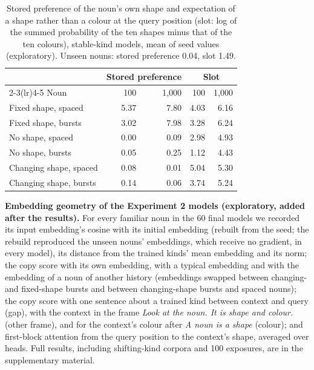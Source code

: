 \begin{table}[!htbp]
\centering\small

\begin{tabular}{@{}lrrrr@{}}
\toprule
 & \multicolumn{2}{c}{Stored preference} & \multicolumn{2}{c}{Slot} \\ \cmidrule(lr){2-3}\cmidrule(lr){4-5}
Noun & 100 & 1,000 & 100 & 1,000 \\
\midrule
Fixed shape, spaced & 5.37 & 7.80 & 4.03 & 6.16 \\
Fixed shape, bursts & 3.02 & 7.98 & 3.28 & 6.24 \\
No shape, spaced & 0.00 & \textminus{}0.09 & \textminus{}2.98 & \textminus{}4.93 \\
No shape, bursts & 0.05 & \textminus{}0.25 & \textminus{}1.12 & \textminus{}4.43 \\
Changing shape, spaced & \textminus{}0.08 & 0.01 & 5.04 & 5.30 \\
Changing shape, bursts & 0.14 & 0.06 & 3.74 & 5.24 \\
\bottomrule
\end{tabular}
\caption{Stored preference of the noun's own shape and expectation of a shape rather than a colour at the query position (slot: log of the summed probability of the ten shapes minus that of the ten colours), stable-kind models, mean of seed values (exploratory). Unseen nouns: stored preference \textminus{}0.04, slot 1.49.}
\label{tab:N3}
\end{table}





\textbf{Embedding geometry of the Experiment 2 models (exploratory, added after the results).} For every familiar noun in the 60 final models we recorded its input embedding's cosine with its initial embedding (rebuilt from the seed; the rebuild reproduced the unseen nouns' embeddings, which receive no gradient, in every model), its distance from the trained kinds' mean embedding and its norm; the copy score with its own embedding, with a typical embedding and with the embedding of a noun of another history (embeddings swapped between changing- and fixed-shape bursts and between changing-shape bursts and spaced nouns); the copy score with one sentence about a trained kind between context and query (gap), with the context in the frame \emph{Look at the \textit{noun}. It is \textit{shape} and \textit{colour}.} (other frame), and for the context's colour after \emph{A \textit{noun} is a \textit{shape}} (colour); and first-block attention from the query position to the context's shape, averaged over heads. Full results, including shifting-kind corpora and 100 exposures, are in the supplementary material.

